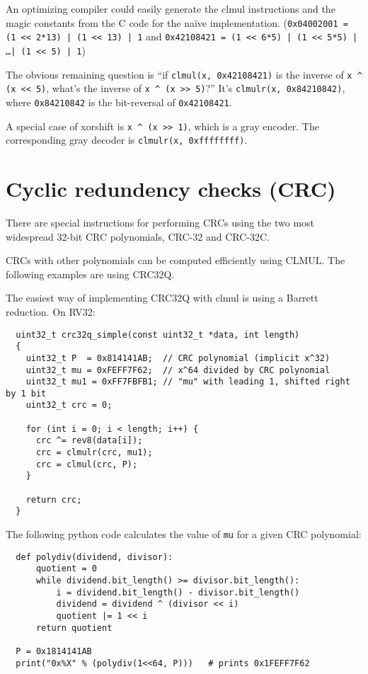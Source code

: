 An optimizing compiler could easily generate the clmul instructions and the magic
constants from the C code for the na\"ive implementation. ({\tt 0x04002001 = (1 << 2*13) | (1 << 13) | 1}
and {\tt 0x42108421 = (1 << 6*5) | (1 << 5*5) | \dots | (1 << 5) | 1})

The obvious remaining question is ``if {\tt clmul(x, 0x42108421)} is the inverse of {\tt x \^{} (x << 5)}, what's
the inverse of {\tt x \^{} (x >> 5)}?'' It's {\tt clmulr(x, 0x84210842)}, where {\tt 0x84210842} is the bit-reversal of {\tt 0x42108421}.

A special case of xorshift is {\tt x \^{} (x >> 1)}, which is a gray encoder. The corresponding gray decoder is {\tt clmulr(x, 0xffffffff)}.


\section{Cyclic redundency checks (CRC)}

There are special instructions for performing CRCs using the two most
widespread 32-bit CRC polynomials, CRC-32 and CRC-32C.

CRCs with other polynomials can be computed efficiently using CLMUL.
The following examples are using CRC32Q.

The easiest way of implementing CRC32Q with clmul is using a Barrett reduction.
On RV32:

\begin{minipage}{\linewidth}
\begin{verbatim}
  uint32_t crc32q_simple(const uint32_t *data, int length)
  {
    uint32_t P  = 0x814141AB;  // CRC polynomial (implicit x^32)
    uint32_t mu = 0xFEFF7F62;  // x^64 divided by CRC polynomial
    uint32_t mu1 = 0xFF7FBFB1; // "mu" with leading 1, shifted right by 1 bit
    uint32_t crc = 0;

    for (int i = 0; i < length; i++) {
      crc ^= rev8(data[i]);
      crc = clmulr(crc, mu1);
      crc = clmul(crc, P);
    }

    return crc;
  }
\end{verbatim}
\end{minipage}

The following python code calculates the value of {\tt mu} for a given CRC
polynomial:

\begin{minipage}{\linewidth}
\begin{verbatim}
  def polydiv(dividend, divisor):
      quotient = 0
      while dividend.bit_length() >= divisor.bit_length():
          i = dividend.bit_length() - divisor.bit_length()
          dividend = dividend ^ (divisor << i)
          quotient |= 1 << i
      return quotient

  P = 0x1814141AB
  print("0x%X" % (polydiv(1<<64, P)))   # prints 0x1FEFF7F62
\end{verbatim}
\end{minipage}

